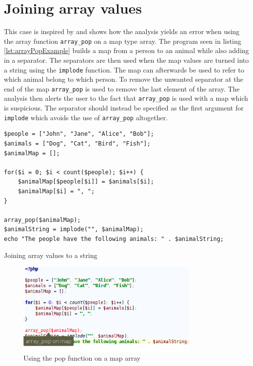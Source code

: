 \section{Joining array values}
This case is inspired by  and shows how the analysis yields an error when using the array function \texttt{array\_pop} on a map type array. The program seen in listing \ref{lst:arrayPopExample} builds a map from a person to an animal while also adding in a separator. The separators are then used when the map values are turned into a string using the \texttt{implode} function. The map can afterwards be used to refer to which animal belong to which person. To remove the unwanted separator at the end of the map \texttt{array\_pop} is used to remove the last element of the array. The analysis then alerts the user to the fact that \texttt{array\_pop} is used with a map which is suspicious. The separator should instead be specified as the first argument for \texttt{implode} which avoids the use of \texttt{array\_pop} altogether.

\begin{program}
\begin{lstlisting}
$people = ["John", "Jane", "Alice", "Bob"];
$animals = ["Dog", "Cat", "Bird", "Fish"];
$animalMap = [];

for($i = 0; $i < count($people); $i++) {
    $animalMap[$people[$i]] = $animals[$i];
    $animalMap[$i] = ", ";
}

array_pop($animalMap);
$animalString = implode("", $animalMap);
echo "The people have the following animals: " . $animalString;
\end{lstlisting}
\caption{Joining array values to a string}
\label{lst:arrayPopExample}
\end{program}

\begin{figure}
\centering
\includegraphics[width=0.8\textwidth]{chapters/caseStudy/newScreens/joinArray}
\caption{Using the pop function on a map array}
\label{fig:arrayPopScreenshot}
\end{figure}

